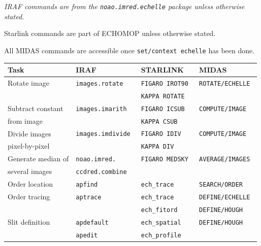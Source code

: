 \documentclass[twoside,11pt]{article}
\newenvironment{latexonly}{}{}
\begin{document}
\begin{latexonly}
\begin{table}
\begin{center}
{\sl
IRAF commands are from the {\tt noao.imred.echelle} package unless otherwise
stated.

Starlink commands are part of ECHOMOP unless otherwise stated.

All MIDAS commands are accessible once {\tt set/context echelle} has been done.
}
\vspace*{11pt}

\begin{tabular}{llll}
\hline\hline
{\bf Task}         & IRAF                   & STARLINK             & MIDAS                     \\
\hline\hline
Rotate image       & {\tt images.rotate   } & {\tt FIGARO IROT90 } & {\tt ROTATE/ECHELLE     } \\
                   &                        & {\tt KAPPA ROTATE  } &                           \\
Subtract constant  & {\tt images.imarith  } & {\tt FIGARO ICSUB  } & {\tt COMPUTE/IMAGE      } \\
from image         &                        & {\tt KAPPA CSUB    } &                           \\
Divide images      & {\tt images.imdivide } & {\tt FIGARO IDIV   } & {\tt COMPUTE/IMAGE      } \\
pixel-by-pixel     &                        & {\tt KAPPA DIV     } &                           \\
Generate median of & {\tt noao.imred.     } & {\tt FIGARO MEDSKY } & {\tt AVERAGE/IMAGES     } \\
several images     & {\tt ccdred.combine  } &                      &                           \\
Order location     & {\tt apfind          } & {\tt ech\_trace    } & {\tt SEARCH/ORDER       } \\
Order tracing      & {\tt aptrace         } & {\tt ech\_trace    } & {\tt DEFINE/ECHELLE     } \\
                   &                        & {\tt ech\_fitord   } & {\tt DEFINE/HOUGH       } \\
Slit definition    & {\tt apdefault       } & {\tt ech\_spatial  } & {\tt DEFINE/HOUGH       } \\
                   & {\tt apedit          } & {\tt ech\_profile  } &                           \\

\end{tabular}
\end{center}
\end{table}
\end{latexonly}
\end{document}
